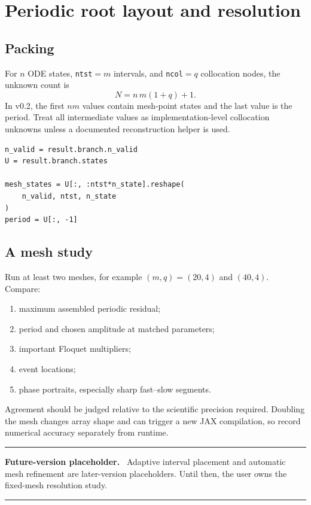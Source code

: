 \documentclass[11pt,oneside]{book}
\newenvironment{futurebox}
  {\par\medskip\noindent\begin{minipage}{\textwidth}
   \color{black!55}\rule{\textwidth}{0.8pt}\par
   \textbf{Future-version placeholder.}\ \color{black}}
  {\par\color{black!55}\rule{\textwidth}{0.8pt}
   \end{minipage}\par\medskip}
\begin{document}
\chapter{Periodic root layout and resolution}

\section{Packing}

For $n$ ODE states, \texttt{ntst}$=m$ intervals, and
\texttt{ncol}$=q$ collocation nodes, the unknown count is
\[
  N=n\,m(1+q)+1.
\]
In v0.2, the first $nm$ values contain mesh-point states and the last value is
the period. Treat all intermediate values as implementation-level collocation
unknowns unless a documented reconstruction helper is used.

\begin{lstlisting}
n_valid = result.branch.n_valid
U = result.branch.states

mesh_states = U[:, :ntst*n_state].reshape(
    n_valid, ntst, n_state
)
period = U[:, -1]
\end{lstlisting}

\section{A mesh study}

Run at least two meshes, for example $(m,q)=(20,4)$ and $(40,4)$. Compare:

\begin{enumerate}
  \item maximum assembled periodic residual;
  \item period and chosen amplitude at matched parameters;
  \item important Floquet multipliers;
  \item event locations;
  \item phase portraits, especially sharp fast--slow segments.
\end{enumerate}

Agreement should be judged relative to the scientific precision required.
Doubling the mesh changes array shape and can trigger a new JAX compilation,
so record numerical accuracy separately from runtime.

\begin{futurebox}
Adaptive interval placement and automatic mesh refinement are later-version
placeholders. Until then, the user owns the fixed-mesh resolution study.
\end{futurebox}
\end{document}

